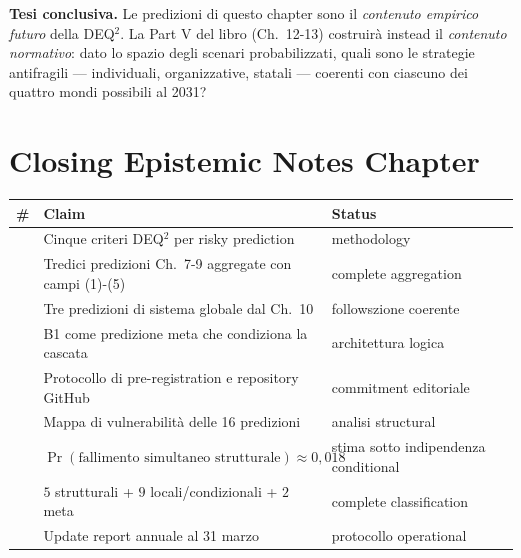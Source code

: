 \Hypoth{} \textbf{Tesi conclusiva.} Le predizioni di questo chapter
sono il \emph{contenuto empirico futuro} della DEQ$^2$. La Part V del
libro (Ch.~12-13) costruirà instead il \emph{contenuto normativo}: dato
lo spazio degli scenari probabilizzati, quali sono le strategie
antifragili --- individuali, organizzative, statali --- coerenti con
ciascuno dei quattro mondi possibili al 2031?



\section{Closing Epistemic Notes
Chapter}\label{note-epistemiche-di-chiusura-chapter}

{\def\LTcaptype{none} %
{\small\begin{longtable}[]{@{}
  >{\raggedright\arraybackslash}p{}
  >{\raggedright\arraybackslash}p{}
  >{\raggedright\arraybackslash}p{}@{}}
\toprule\noalign{}
\begin{minipage}[b]{\linewidth}\raggedright
\#
\end{minipage} & \begin{minipage}[b]{\linewidth}\raggedright
Claim
\end{minipage} & \begin{minipage}[b]{\linewidth}\raggedright
Status
\end{minipage} \\
\midrule\noalign{}
\endhead
\bottomrule\noalign{}
\endlastfoot
1 & Cinque criteri DEQ$^2$ per risky prediction & \Hypoth{}
methodology \\
2 & Tredici predizioni Ch.~7-9 aggregate con campi (1)-(5) & \Proved{}
complete aggregation \\
3 & Tre predizioni di sistema globale dal Ch.~10 & \Hypoth{}
followszione coerente \\
4 & B1 come predizione meta che condiziona la cascata & \Hypoth{}
architettura logica \\
5 & Protocollo di pre-registration e repository GitHub & \Hypoth{}
commitment editoriale \\
6 & Mappa di vulnerabilità delle 16 predizioni & \Hypoth{} analisi
structural \\
7 & \(\Pr(\text{fallimento simultaneo strutturale}) \approx 0{,}018\) &
\Conj{} stima sotto indipendenza conditional \\
8 & \(5\) strutturali + \(9\) locali/condizionali + \(2\) meta &
\Proved{} complete classification \\
9 & Update report annuale al 31 marzo & \Hypoth{} protocollo
operational \\
\end{longtable}}
}



